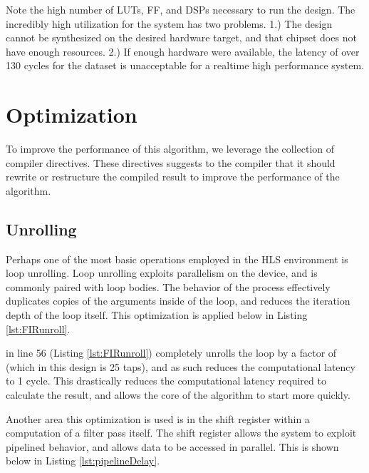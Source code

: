 \documentclass[11pt]{report}
\begin{document}
 Note the high number of LUTs, FF, and DSPs necessary to run the design. The incredibly high utilization for the system has two problems. 1.) The design cannot be synthesized on the desired hardware target, and that chipset does not have enough resources. 2.) If enough hardware were available, the latency of over 130 cycles for the dataset is unacceptable for a realtime high performance system.
 
 \section{Optimization}
 To improve the performance of this algorithm, we leverage the  collection of compiler directives. These directives suggests to the compiler that it should rewrite or restructure the compiled result to improve the performance of the algorithm.
 
 \subsection{Unrolling}
Perhaps one of the most basic operations employed in the HLS environment is loop unrolling. Loop unrolling exploits parallelism on the device, and is commonly paired with  loop bodies. The behavior of the process effectively duplicates copies of the arguments inside of the loop, and reduces the iteration depth of the loop itself. This optimization is applied below in Listing \ref{lst:FIRunroll}.

\begin{quote}
\begin{singlespace}
    
\end{singlespace}
\end{quote}

 in line 56 (Listing \ref{lst:FIRunroll}) completely unrolls the loop by a factor of  (which in this design is 25 taps), and as such reduces the computational latency to 1 cycle. This drastically reduces the computational latency required to calculate the result, and allows the core of the algorithm to start more quickly.

Another area this optimization is used is in the shift register within a computation of a filter pass itself. The shift register allows the system to exploit pipelined behavior, and allows data to be accessed in parallel. This is shown below in Listing \ref{lst:pipelineDelay}.
\end{document}
